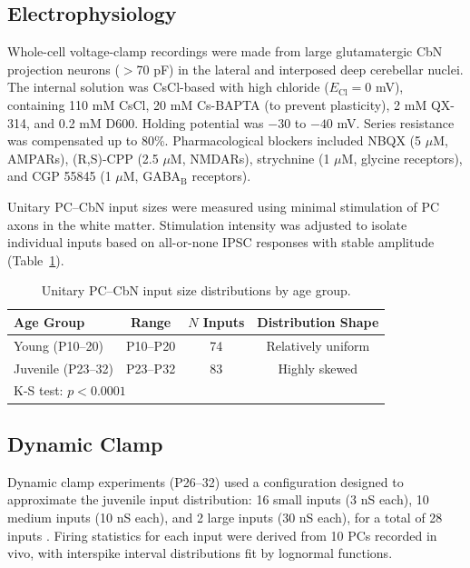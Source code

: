 \documentclass[12pt]{article}
\begin{document}
\subsection{Electrophysiology}

Whole-cell voltage-clamp recordings were made from large glutamatergic CbN projection neurons ($>$70 pF) in the lateral and interposed deep cerebellar nuclei. The internal solution was CsCl-based with high chloride ($E_\text{Cl} = 0$ mV), containing 110 mM CsCl, 20 mM Cs-BAPTA (to prevent plasticity), 2 mM QX-314, and 0.2 mM D600. Holding potential was $-30$ to $-40$ mV. Series resistance was compensated up to 80\%. Pharmacological blockers included NBQX (5 $\mu$M, AMPARs), (R,S)-CPP (2.5 $\mu$M, NMDARs), strychnine (1 $\mu$M, glycine receptors), and CGP 55845 (1 $\mu$M, GABA$_\text{B}$ receptors).

Unitary PC--CbN input sizes were measured using minimal stimulation of PC axons in the white matter. Stimulation intensity was adjusted to isolate individual inputs based on all-or-none IPSC responses with stable amplitude (Table~\ref{tab:inputs}).

\begin{table}[htbp]
\centering
\caption{Unitary PC--CbN input size distributions by age group.}
\label{tab:inputs}
\begin{tabular}{lccc}
\toprule
Age Group & Range & $N$ Inputs & Distribution Shape \\
\midrule
Young (P10--20) & P10--P20 & 74 & Relatively uniform \\
Juvenile (P23--32) & P23--P32 & 83 & Highly skewed \\
\multicolumn{2}{l}{K-S test: $p < 0.0001$} & & \\
\bottomrule
\end{tabular}
\end{table}

\subsection{Dynamic Clamp}

Dynamic clamp experiments (P26--32) used a configuration designed to approximate the juvenile input distribution: 16 small inputs (3 nS each), 10 medium inputs (10 nS each), and 2 large inputs (30 nS each), for a total of 28 inputs \citep{sharp2011dynamic}. Firing statistics for each input were derived from 10 PCs recorded in vivo, with interspike interval distributions fit by lognormal functions.
\end{document}
